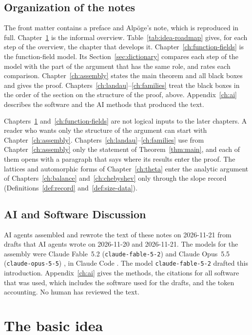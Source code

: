 \documentclass[11pt]{amsbook}
\theoremstyle{plain}
\theoremstyle{definition}
\theoremstyle{remark}
\numberwithin{equation}{section}
\numberwithin{figure}{chapter}
\numberwithin{table}{chapter}
\begin{document}
\section*{Organization of the notes}

The front matter contains a preface and Alp\"oge's note, which is
reproduced in full. Chapter~\ref{ch:idea} is the informal overview.
Table~\ref{tab:idea-roadmap} gives, for each step of the overview,
the chapter that develops it. Chapter~\ref{ch:function-fields} is
the function-field model. Its Section~\ref{sec:dictionary} compares
each step of the model with the part of the argument that has the
same role, and rates each comparison. Chapter~\ref{ch:assembly}
states the main theorem and all black boxes and gives the proof.
Chapters~\ref{ch:landau}--\ref{ch:families} treat the black boxes
in the order of the section on the structure of the proof, above.
Appendix~\ref{ch:ai} describes the software and the AI methods that
produced the text.

Chapters~\ref{ch:idea} and~\ref{ch:function-fields} are not logical
inputs to the later chapters. A reader who wants only the
structure of the argument can start with
Chapter~\ref{ch:assembly}. Chapters~\ref{ch:landau}--\ref{ch:families} use from
Chapter~\ref{ch:assembly} only the statement of
Theorem~\ref{thm:main}, and each of them opens with a paragraph
that says where its results enter the proof. The lattices and
automorphic forms of Chapter~\ref{ch:theta} enter the analytic
argument of Chapters~\ref{ch:balance} and~\ref{ch:chebyshev} only
through the slope record (Definitions~\ref{def:record}
and~\ref{def:size-data}).

\section*{AI and Software Discussion}
\label{intro:ai}

AI agents assembled and rewrote the text of these notes on
2026-11-21 from drafts that AI agents wrote on 2026-11-20 and
2026-11-21. The models for the assembly were Claude Fable~5.2
(\texttt{claude-fable-5-2}) \cite{ClaudeFable52} and Claude
Opus~5.5 (\texttt{claude-opus-5-5}) \cite{ClaudeOpus55}, in Claude
Code \cite{ClaudeCode}. The model \texttt{claude-fable-5-2} drafted
this introduction. Appendix~\ref{ch:ai} gives the methods, the
citations for all software that was used, which includes the
software used for the drafts, and the token accounting. No human
has reviewed the text.
\clearpage
\clearpage
\chapter{The basic idea}
\label{ch:idea}
\end{document}
